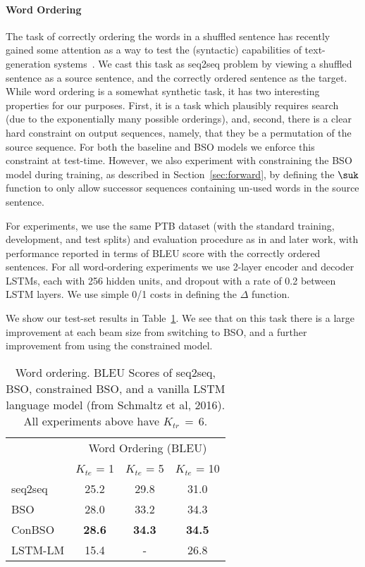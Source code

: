 \paragraph{Word Ordering}
The task of correctly ordering the words in a shuffled sentence has recently gained some
attention as a way to test the (syntactic) capabilities of
text-generation
systems~\cite{zhang11syntax,zhang15discriminative,liu15transition,schmaltz16word}. 
We cast this task as seq2seq problem by viewing a shuffled sentence as
a source sentence, and the correctly ordered sentence as the
target. While word ordering is a somewhat synthetic task, it has two interesting properties for our purposes. First, it is a task which plausibly requires search (due to the exponentially many possible orderings), and, second, there is a clear hard constraint on output sequences, namely, that they be a permutation of the source sequence. For both the baseline and BSO models we
enforce this constraint at test-time. However, we also experiment with
constraining the BSO model during training, as described in Section~\ref{sec:forward}, by defining the $\suk$ function to only allow successor sequences containing un-used words in the source sentence.

For experiments, we use the same PTB dataset (with the standard training,
development, and test splits) and evaluation procedure as in
 and later work, with performance reported in terms of BLEU
score with the correctly ordered sentences. For all word-ordering
experiments we use 2-layer encoder and decoder LSTMs, each with 256
hidden units, and dropout with a rate of 0.2 between LSTM layers. We use simple 0/1 costs in defining the $\Delta$ function.  

We show our test-set results
in Table~\ref{tab:wo}. We see that on this task there is a large improvement at 
each beam size from switching to BSO, and a further improvement from using 
the constrained model.

\begin{table}
  \centering
  \begin{tabular}{lccc}
    \toprule
     & \multicolumn{3}{c}{Word Ordering (BLEU) } \\ 
          & $K_{te}$ = 1 & $K_{te}$ = 5 & $K_{te}$ = 10 \\ 
    \midrule
    seq2seq & 25.2 & 29.8 & 31.0 \\
    BSO     & 28.0 & 33.2 & 34.3 \\
    ConBSO & \textbf{28.6} & \textbf{34.3} & \textbf{34.5} \\
    \midrule
    LSTM-LM & 15.4 &  - & 26.8 \\
    \bottomrule
  \end{tabular}
  \caption{Word ordering. BLEU Scores of seq2seq, BSO, constrained BSO, and a vanilla LSTM language model (from Schmaltz et al, 2016). All experiments above have $K_{tr}\,{=}\,6$.}
  \label{tab:wo}
\end{table}

